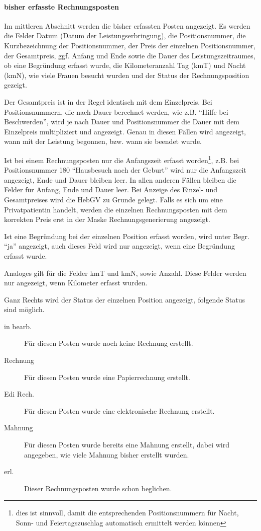 \paragraph{bisher erfasste Rechnungsposten}
Im mittleren Abschnitt werden die bisher erfassten Posten angezeigt.
Es werden die Felder Datum (Datum der Leistungserbringung), die 
Positionsnummer, die Kurzbezeichnung der Positionsnummer, der Preis
der einzelnen Positionsnummer, der Gesamtpreis, ggf. Anfang und Ende
sowie die Dauer des Leistungszeitraumes, ob eine Begründung erfasst wurde,
die Kilometeranzahl Tag (kmT) und Nacht (kmN), wie viele Frauen besucht
wurden und der Status der Rechnungsposition gezeigt.

Der Gesamtpreis ist in der Regel identisch mit dem Einzelpreis. Bei
Positionsnummern, die nach Dauer berechnet werden, wie z.B.
``Hilfe bei Beschwerden'', wird je nach Dauer und Positionsnummer die Dauer
mit dem Einzelpreis multipliziert und angezeigt.
Genau in diesen Fällen wird angezeigt, wann mit der Leistung begonnen, bzw.
wann sie beendet wurde. 

Ist bei einem Rechnungsposten nur die Anfangszeit erfasst worden\footnote{dies
ist sinnvoll, damit die entsprechenden
Positionsnummern für Nacht, Sonn- und Feiertagszuschlag automatisch ermittelt 
werden können}, z.B.
bei Positionsnummer 180 ``Hausbesuch nach der Geburt'' wird nur die 
Anfangszeit angezeigt, Ende und Dauer bleiben leer.
In allen anderen Fällen bleiben die Felder für
Anfang, Ende und Dauer leer. 
Bei Anzeige des Einzel- und Gesamtpreises wird die HebGV zu Grunde gelegt.
Falls es sich um eine Privatpatientin
 handelt, werden die einzelnen
Rechnungsposten mit dem korrekten Preis erst in der Maske 
Rechnungsgenerierung angezeigt.

Ist eine Begründung bei der einzelnen Position erfasst worden, wird unter
Begr. ``ja'' angezeigt, auch dieses Feld wird nur angezeigt, wenn eine
Begründung erfasst wurde.

Analoges gilt für die Felder kmT und kmN, sowie Anzahl. Diese Felder werden
nur angezeigt, wenn Kilometer erfasst wurden.

Ganz Rechts wird der Status der einzelnen Position angezeigt, folgende
Status sind möglich.
\begin{description}
\item[in bearb.] 
Für diesen Posten wurde noch keine Rechnung erstellt.
\item[Rechnung] 
Für diesen Posten wurde eine Papierrechnung erstellt. 
\item[Edi Rech.] 
Für diesen Posten wurde eine elektronische Rechnung erstellt. 
\item[Mahnung]
Für diesen Posten wurde bereits eine Mahnung erstellt, dabei wird angegeben, 
wie viele Mahnung bisher erstellt wurden.
\item[erl.] 
Dieser Rechnungsposten wurde schon beglichen.
\end{description}

